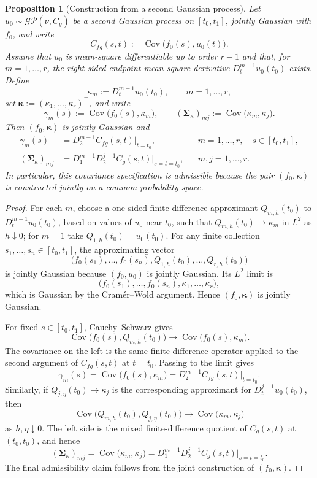 \documentclass[11pt,a4paper]{article}
\newtheorem{proposition}{Proposition}
\theoremstyle{definition}
\theoremstyle{remark}
\DeclareMathOperator{\Cov}{Cov}
\begin{document}
\begin{proposition}[Construction from a second Gaussian process]\label{prop:appendix-second-process}
Let $u_0\sim\mathcal{GP}(\nu,C_g)$ be a second Gaussian process on $[t_0,t_1]$, jointly Gaussian with $f_0$, and write
\[
C_{fg}(s,t):=\Cov\bigl(f_0(s),u_0(t)\bigr).
\]
Assume that \(u_0\) is mean-square differentiable up to order \(r-1\) and that, for \(m=1,\ldots,r\), the right-sided endpoint mean-square derivative \(D_t^{m-1}u_0(t_0)\) exists. Define
\[
\kappa_m:=D_t^{m-1}u_0(t_0),\qquad m=1,\ldots,r,
\]
set $\boldsymbol{\kappa}:=(\kappa_1,\ldots,\kappa_r)^\top$, and write
\[
\gamma_m(s):=\Cov\bigl(f_0(s),\kappa_m\bigr),\qquad
(\boldsymbol{\Sigma}_{\kappa})_{mj}:=\Cov\bigl(\kappa_m,\kappa_j\bigr).
\]
Then \((f_0,\boldsymbol{\kappa})\) is jointly Gaussian and
\begin{align*}
\gamma_m(s)&=D_2^{m-1}C_{fg}(s,t)\big|_{t=t_0}, && m=1,\ldots,r,\quad s\in[t_0,t_1],\\
(\boldsymbol{\Sigma}_{\kappa})_{mj}&=D_1^{m-1}D_2^{j-1}C_g(s,t)\big|_{s=t=t_0}, && m,j=1,\ldots,r.
\end{align*}
In particular, this covariance specification is admissible because the pair \((f_0,\boldsymbol{\kappa})\) is constructed jointly on a common probability space.
\end{proposition}

\begin{proof}
For each $m$, choose a one-sided finite-difference approximant $Q_{m,h}(t_0)$ to $D_t^{m-1}u_0(t_0)$, based on values of $u_0$ near $t_0$, such that $Q_{m,h}(t_0)\to\kappa_m$ in $L^2$ as $h\downarrow0$; for $m=1$ take $Q_{1,h}(t_0)=u_0(t_0)$. For any finite collection $s_1,\ldots,s_n\in[t_0,t_1]$, the approximating vector
\[
\bigl(f_0(s_1),\ldots,f_0(s_n),Q_{1,h}(t_0),\ldots,Q_{r,h}(t_0)\bigr)
\]
is jointly Gaussian because $(f_0,u_0)$ is jointly Gaussian. Its $L^2$ limit is
\[
\bigl(f_0(s_1),\ldots,f_0(s_n),\kappa_1,\ldots,\kappa_r\bigr),
\]
which is Gaussian by the Cram\'er--Wold argument. Hence $(f_0,\boldsymbol{\kappa})$ is jointly Gaussian.

For fixed $s\in[t_0,t_1]$, Cauchy--Schwarz gives
\[
\Cov\bigl(f_0(s),Q_{m,h}(t_0)\bigr)\to \Cov\bigl(f_0(s),\kappa_m\bigr).
\]
The covariance on the left is the same finite-difference operator applied to the second argument of $C_{fg}(s,t)$ at $t=t_0$. Passing to the limit gives
\[
\gamma_m(s)=\Cov\bigl(f_0(s),\kappa_m\bigr)=D_2^{m-1}C_{fg}(s,t)\big|_{t=t_0}.
\]
Similarly, if $Q_{j,\eta}(t_0)\to\kappa_j$ is the corresponding approximant for $D_t^{j-1}u_0(t_0)$, then
\[
\Cov\bigl(Q_{m,h}(t_0),Q_{j,\eta}(t_0)\bigr)\to \Cov\bigl(\kappa_m,\kappa_j\bigr)
\]
as $h,\eta\downarrow0$. The left side is the mixed finite-difference quotient of $C_g(s,t)$ at $(t_0,t_0)$, and hence
\[
(\boldsymbol{\Sigma}_{\kappa})_{mj}
=\Cov\bigl(\kappa_m,\kappa_j\bigr)
=D_1^{m-1}D_2^{j-1}C_g(s,t)\big|_{s=t=t_0}.
\]
The final admissibility claim follows from the joint construction of $(f_0,\boldsymbol{\kappa})$.
\end{proof}
\end{document}
